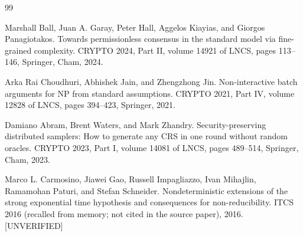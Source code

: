 \documentclass{conjura-conjecture}
\begin{document}
\begin{conjurabibliography}{99}

Marshall Ball, Juan A. Garay, Peter Hall, Aggelos Kiayias, and Giorgos Panagiotakos.
Towards permissionless consensus in the standard model via fine-grained complexity.
CRYPTO 2024, Part II, volume 14921 of LNCS, pages 113--146, Springer, Cham, 2024.

Arka Rai Choudhuri, Abhishek Jain, and Zhengzhong Jin.
Non-interactive batch arguments for NP from standard assumptions.
CRYPTO 2021, Part IV, volume 12828 of LNCS, pages 394--423, Springer, 2021.

Damiano Abram, Brent Waters, and Mark Zhandry.
Security-preserving distributed samplers: How to generate any CRS in one round without random oracles.
CRYPTO 2023, Part I, volume 14081 of LNCS, pages 489--514, Springer, Cham, 2023.

Marco L. Carmosino, Jiawei Gao, Russell Impagliazzo, Ivan Mihajlin, Ramamohan Paturi, and Stefan Schneider.
Nondeterministic extensions of the strong exponential time hypothesis and consequences for non-reducibility.
ITCS 2016 (recalled from memory; not cited in the source paper), 2016.
[UNVERIFIED]

\end{conjurabibliography}
\end{document}
